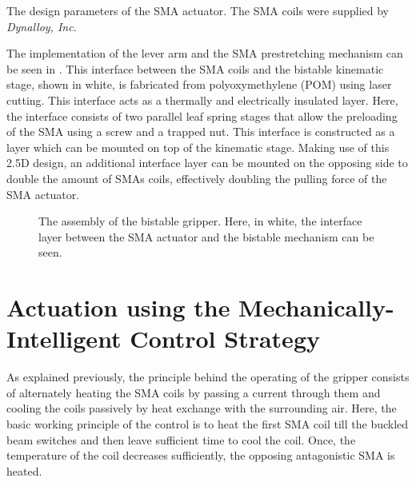 \begin{table}[hbt!]
    \centering
    \caption{The design parameters of the SMA actuator. The SMA coils were supplied by \textit{Dynalloy, Inc.}}
    \label{tab:sma-design-parameters}
    
\end{table}

The implementation of the lever arm and the SMA prestretching mechanism can be seen in \todocite. This interface between the SMA coils and the bistable kinematic stage, shown in white, is fabricated from polyoxymethylene (POM) using laser cutting. This interface acts as a thermally and electrically insulated layer. Here, the interface consists of two parallel leaf spring stages that allow the preloading of the SMA using a screw and a trapped nut. This interface is constructed as a layer which can be mounted on top of the kinematic stage. Making use of this 2.5D design, an additional interface layer can be mounted on the opposing side to double the amount of SMAs coils, effectively doubling the pulling force of the SMA actuator.

\begin{figure}[hbt!] %
  \centering
  
  \caption{The assembly of the bistable gripper. Here, in white, the interface layer between the SMA actuator and the bistable mechanism can be seen.}
  \label{fig:assembly-gripper}
\end{figure}

\section{Actuation using the Mechanically-Intelligent Control Strategy}
As explained previously, the principle behind the operating of the gripper consists of alternately heating the SMA coils by passing a current through them and cooling the coils passively by heat exchange with the surrounding air. Here, the basic working principle of the control is to heat the first SMA coil till the buckled beam switches and then leave sufficient time to cool the coil. Once, the temperature of the coil decreases sufficiently, the opposing antagonistic SMA is heated.

